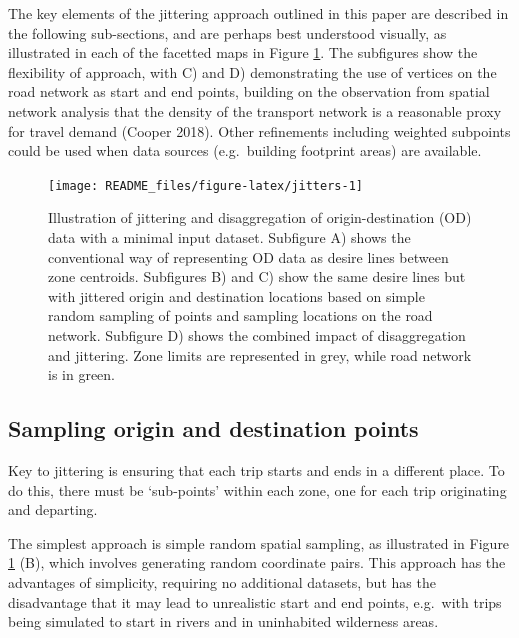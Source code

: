 \documentclass[
]{article}
\begin{document}
The key elements of the jittering approach outlined in this paper are described in the following sub-sections, and are perhaps best understood visually, as illustrated in each of the facetted maps in Figure \ref{fig:jitters}.
The subfigures show the flexibility of approach, with C) and D) demonstrating the use of vertices on the road network as start and end points, building on the observation from spatial network analysis that the density of the transport network is a reasonable proxy for travel demand (Cooper 2018).
Other refinements including weighted subpoints could be used when data sources (e.g.~building footprint areas) are available.

\begin{figure}

{\centering \texttt{[image: README\_files/figure-latex/jitters-1]} 

}

\caption{Illustration of jittering and disaggregation of origin-destination (OD) data with a minimal input dataset. Subfigure A) shows the conventional way of representing OD data as desire lines between zone centroids. Subfigures B) and C) show the same desire lines but with jittered origin and destination locations based on simple random sampling of points and sampling locations on the road network. Subfigure D) shows the combined impact of disaggregation and jittering. Zone limits are represented in grey, while road network is in green.}\label{fig:jitters}
\end{figure}

\hypertarget{sampling-origin-and-destination-points}{%
\subsection{Sampling origin and destination points}\label{sampling-origin-and-destination-points}}

Key to jittering is ensuring that each trip starts and ends in a different place.
To do this, there must be `sub-points' within each zone, one for each trip originating and departing.

The simplest approach is simple random spatial sampling, as illustrated in Figure \ref{fig:jitters} (B), which involves generating random coordinate pairs.
This approach has the advantages of simplicity, requiring no additional datasets, but has the disadvantage that it may lead to unrealistic start and end points, e.g.~with trips being simulated to start in rivers and in uninhabited wilderness areas.
\end{document}
